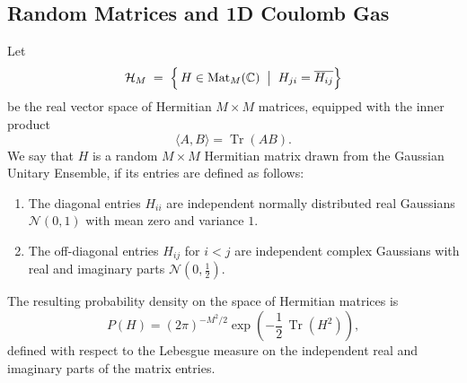 \documentclass[12pt,reqno]{amsart}
\theoremstyle{plain}
\theoremstyle{definition}
\theoremstyle{remark}
\begin{document}
\subsection{Random Matrices and 1D Coulomb Gas}
\label{ss:2.1}
Let
\begin{equation}
\mathcal H_M \;=\;
\Bigl\{\,H\in\operatorname{Mat}_{M}(\mathbb C)\;\bigm|\;  H_{ji} = \overline{H_{ij}}  \Bigr\}
\end{equation}
be the real vector space of Hermitian \(M \times M \) matrices, equipped with the inner product
\begin{equation}
\langle A,B\rangle=\operatorname{Tr}(AB).
\end{equation}  
We say that \( H \) is a random \( M \times M \) Hermitian matrix drawn from the Gaussian Unitary Ensemble, if its entries are defined as follows:
\begin{enumerate}
\item The diagonal entries \( H_{ii} \) are independent normally distributed real Gaussians \( \mathcal{N} \left (0, 1 \right ) \) with mean zero and variance \(1\). 

\item The off-diagonal entries \( H_{ij} \) for \( i < j \) are independent complex Gaussians with real and imaginary parts \( \mathcal{N} \left (0, \tfrac{1}{2} \right ) \).
\end{enumerate}
The resulting probability density on the space of Hermitian matrices is
\begin{equation}
P(H) = (2\pi)^{-M^2/2}
\exp\!\left(-\frac{1}{2}\,\operatorname{Tr}(H^2)\right),
\end{equation}
defined with respect to the Lebesgue measure on the independent real and imaginary parts of the matrix entries.
\end{document}
